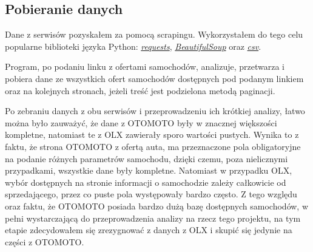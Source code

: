 \documentclass{article}
\begin{document}
\subsection{Pobieranie danych}
Dane z serwisów pozyskałem za pomocą scrapingu. Wykorzystałem do tego celu popularne biblioteki języka Python: \href{https://pypi.org/project/requests/}{\textit{requests}}, \href{https://pypi.org/project/beautifulsoup4/}{\textit{BeautifulSoup}} oraz \href{https://docs.python.org/3/library/csv.html}{\textit{csv}}.

Program, po podaniu linku z ofertami samochodów, analizuje, przetwarza i pobiera dane ze wszystkich ofert samochodów dostępnych pod podanym linkiem oraz na kolejnych stronach, jeżeli treść jest podzielona metodą paginacji. 

Po zebraniu danych z obu serwisów i przeprowadzeniu ich krótkiej analizy, łatwo można było zauważyć, że dane z OTOMOTO były w znacznej większości kompletne, natomiast te z OLX zawierały sporo wartości pustych. Wynika to z faktu, że strona OTOMOTO z ofertą auta, ma przeznaczone pola obligatoryjne na podanie różnych parametrów samochodu, dzięki czemu, poza nielicznymi przypadkami, wszystkie dane były kompletne. Natomiast w przypadku OLX, wybór dostępnych na stronie informacji o samochodzie zależy całkowicie od sprzedającego, przez co puste pola występowały bardzo często. Z tego względu oraz faktu, że OTOMOTO posiada bardzo dużą bazę dostępnych samochodów, w pełni wystarczającą do przeprowadzenia analizy na rzecz tego projektu, na tym etapie zdecydowałem się zrezygnować z danych z OLX i skupić się jedynie na części z OTOMOTO.
\end{document}
